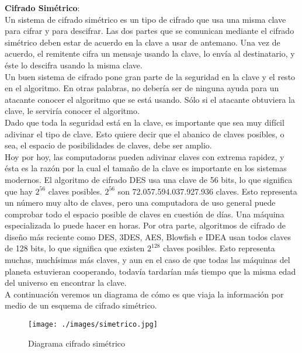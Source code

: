 \documentclass[12pt,oneside,onecolumn,openany]{report}
\begin{document}
\textbf{Cifrado Simétrico}:\\
Un sistema de cifrado simétrico es un tipo de cifrado que usa una misma clave para cifrar y para descifrar. Las dos partes que se comunican mediante el cifrado simétrico deben estar de acuerdo en la clave a usar de antemano. Una vez de acuerdo, el remitente cifra un mensaje usando la clave, lo envía al destinatario, y éste lo descifra usando la misma clave.\\
Un buen sistema de cifrado pone gran parte de la seguridad en la clave y el resto en el algoritmo. En otras palabras, no debería ser de ninguna ayuda para un atacante conocer el algoritmo que se está usando. Sólo si el atacante obtuviera la clave, le serviría conocer el algoritmo.\\
Dado que toda la seguridad está en la clave, es importante que sea muy difícil adivinar el tipo de clave. Esto quiere decir que el abanico de claves posibles, o sea, el espacio de posibilidades de claves, debe ser amplio.\\
Hoy por hoy, las computadoras pueden adivinar claves con extrema rapidez, y ésta es la razón por la cual el tamaño de la clave es importante en los sistemas modernos. El algoritmo de cifrado DES usa una clave de 56 bits, lo que significa que hay 
\(2^{56}\) claves posibles. \(2^{56}\) son 72.057.594.037.927.936 claves. Esto representa un número muy alto de claves, pero una computadora de uso general puede comprobar todo el espacio posible de claves en cuestión de días. Una máquina especializada lo puede hacer en horas. 
Por otra parte, algoritmos de cifrado de diseño más reciente como DES, 3DES, AES, Blowfish e IDEA usan todos claves de 128 bits, lo que significa que existen \(2^{128}\) claves posibles. Esto representa muchas, muchísimas más claves, y aun en el caso de que todas las máquinas del planeta estuvieran cooperando, 
todavía tardarían más tiempo que la misma edad del universo en encontrar la clave. \cite{sime}\\
A continuación veremos un diagrama de cómo es que viaja la información por medio de un esquema de cifrado simétrico.\\

\begin{figure}[H]
	\texttt{[image: ./images/simetrico.jpg]}
	\caption{Diagrama cifrado simétrico}
	\label{fig:1-2-1}
\end{figure}
\end{document}
